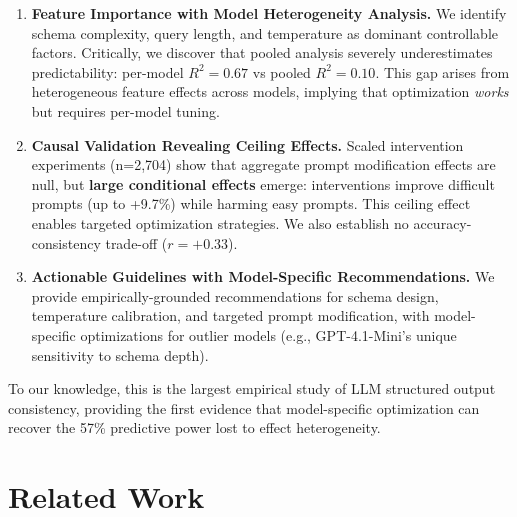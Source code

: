 \documentclass[sigconf,anonymous,review]{acmart}
\begin{document}
\begin{enumerate}
    \item \textbf{Feature Importance with Model Heterogeneity Analysis.} We identify schema complexity, query length, and temperature as dominant controllable factors. Critically, we discover that pooled analysis severely underestimates predictability: per-model $R^2=0.67$ vs pooled $R^2=0.10$. This gap arises from heterogeneous feature effects across models, implying that optimization \textit{works} but requires per-model tuning.

    \item \textbf{Causal Validation Revealing Ceiling Effects.} Scaled intervention experiments (n=2,704) show that aggregate prompt modification effects are null, but \textbf{large conditional effects} emerge: interventions improve difficult prompts (up to +9.7\%) while harming easy prompts. This ceiling effect enables targeted optimization strategies. We also establish no accuracy-consistency trade-off ($r=+0.33$).

    \item \textbf{Actionable Guidelines with Model-Specific Recommendations.} We provide empirically-grounded recommendations for schema design, temperature calibration, and targeted prompt modification, with model-specific optimizations for outlier models (e.g., GPT-4.1-Mini's unique sensitivity to schema depth).
\end{enumerate}

\noindent To our knowledge, this is the largest empirical study of LLM structured output consistency, providing the first evidence that model-specific optimization can recover the 57\% predictive power lost to effect heterogeneity.

\section{Related Work}
\label{sec:related}
\end{document}
